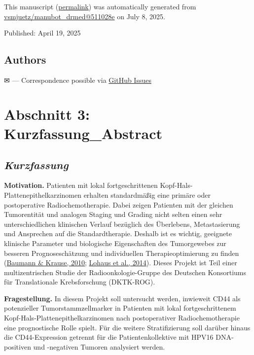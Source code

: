 This manuscript
(\href{https://vsmjuetz.github.io/manubot_drmed/v/511028e13bfc7760f0d9efb648daf8ab85a6ba6d/}{permalink})
was automatically generated
from \href{https://github.com/vsmjuetz/manubot_drmed/tree/511028e13bfc7760f0d9efb648daf8ab85a6ba6d}{vsmjuetz/manubot\_drmed@511028e}
on July 8, 2025.

Published: April 19, 2025

\hypertarget{authors}{%
\subsection{Authors}\label{authors}}

\leavevmode{}%
✉ --- Correspondence possible via \href{https://github.com/vsmjuetz/manubot_drmed/issues}{GitHub Issues}

\hypertarget{abschnitt-3-kurzfassung_abstract}{%
\section{Abschnitt 3: Kurzfassung\_Abstract}\label{abschnitt-3-kurzfassung_abstract}}

\hypertarget{kurzfassung}{%
\subsection{\texorpdfstring{\textbf{\emph{Kurzfassung}}}{Kurzfassung}}\label{kurzfassung}}

\textbf{Motivation.} Patienten mit lokal fortgeschrittenen Kopf-Hals-Plattenepithelkarzinomen erhalten standardmäßig eine primäre oder postoperative Radiochemotherapie. Dabei zeigen Patienten mit der gleichen Tumorentität und analogen Staging und Grading nicht selten einen sehr unterschiedlichen klinischen Verlauf bezüglich des Überlebens, Metastasierung und Ansprechen auf die Standardtherapie. Deshalb ist es wichtig, geeignete klinische Parameter und biologische Eigenschaften des Tumorgewebes zur besseren Prognoseschätzung und individuellen Therapieoptimierung zu finden (\href{about:blank\#_ENREF_9}{Baumann \& Krause, 2010}; \href{about:blank\#_ENREF_52}{Lohaus et al., 2014}). Dieses Projekt ist Teil einer multizentrischen Studie der Radioonkologie-Gruppe des Deutschen Konsortiums für Translationale Krebsforschung (DKTK-ROG).

\textbf{Fragestellung.} In diesem Projekt soll untersucht werden, inwieweit CD44 als potenzieller Tumorstammzellmarker in Patienten mit lokal fortgeschrittenem Kopf-Hals-Plattenepithelkarzinomen nach postoperativer Radiochemotherapie eine prognostische Rolle spielt. Für die weitere Stratifizierung soll darüber hinaus die CD44-Expression getrennt für die Patientenkollektive mit HPV16 DNA-positiven und -negativen Tumoren analysiert werden.

